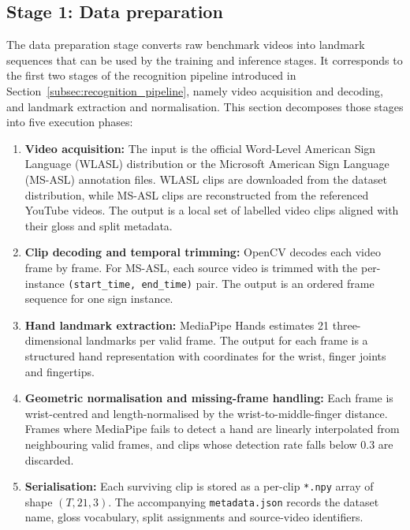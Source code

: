 \subsection{Stage 1: Data preparation}
\label{subsec:data_preparation}

The data preparation stage converts raw benchmark videos into landmark sequences that can be used
by the training and inference stages. It corresponds to the first two stages of the recognition
pipeline introduced in Section~\ref{subsec:recognition_pipeline}, namely video acquisition and
decoding, and landmark extraction and normalisation. This section decomposes those stages into five
execution phases:

\begin{enumerate}
    \item \textbf{Video acquisition:} The input is the official Word-Level American Sign Language
          (WLASL) distribution or the Microsoft American Sign Language (MS-ASL) annotation files.
          WLASL clips are downloaded from the dataset distribution, while MS-ASL clips are
          reconstructed from the referenced YouTube videos. The output is a local set of labelled
          video clips aligned with their gloss and split metadata.
    \item \textbf{Clip decoding and temporal trimming:} OpenCV decodes each video frame by frame.
          For MS-ASL, each source video is trimmed with the per-instance \texttt{(start\_time,
              end\_time)} pair. The output is an ordered frame sequence for one sign instance.
    \item \textbf{Hand landmark extraction:} MediaPipe Hands estimates 21 three-dimensional
          landmarks per valid frame. The output for each frame is a structured hand representation
          with coordinates for the wrist, finger joints and fingertips.
    \item \textbf{Geometric normalisation and missing-frame handling:} Each frame is wrist-centred
          and length-normalised by the wrist-to-middle-finger distance. Frames where MediaPipe fails
          to detect a hand are linearly interpolated from neighbouring valid frames, and clips whose
          detection rate falls below 0.3 are discarded.
    \item \textbf{Serialisation:} Each surviving clip is stored as a per-clip \texttt{*.npy} array
          of shape $(T, 21, 3)$. The accompanying \texttt{metadata.json} records the dataset name,
          gloss vocabulary, split assignments and source-video identifiers.
\end{enumerate}

